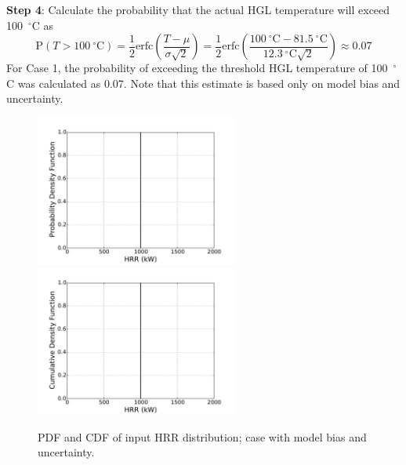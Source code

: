 \documentclass[12pt]{article}
\begin{document}
\textbf{Step 4}: Calculate the probability that the actual HGL temperature will exceed 100~$^\circ$C as
\begin{equation}
\textrm{P}(T > 100~^\circ\textrm{C}) = \frac{1}{2} \textrm{erfc} \left( \frac{T - \mu}{\sigma \sqrt{2}} \right) = \frac{1}{2} \textrm{erfc} \left( \frac{100~^\circ\textrm{C} - 81.5~^\circ\textrm{C}}{12.3~^\circ\textrm{C} \sqrt{2}} \right) \approx 0.07
\end{equation}
For Case 1, the probability of exceeding the threshold HGL temperature of 100~$^\circ$C was calculated as 0.07. Note that this estimate is based only on model bias and uncertainty.


\clearpage


\begin{figure}[p]
\includegraphics[width=2.6in]{Figures/input_PDF_point}
\includegraphics[width=2.6in]{Figures/input_CDF_point}
\caption{PDF and CDF of input HRR distribution; case with model bias and uncertainty.}
\label{fig:case_1_input_distributions}
\end{figure}
\end{document}

